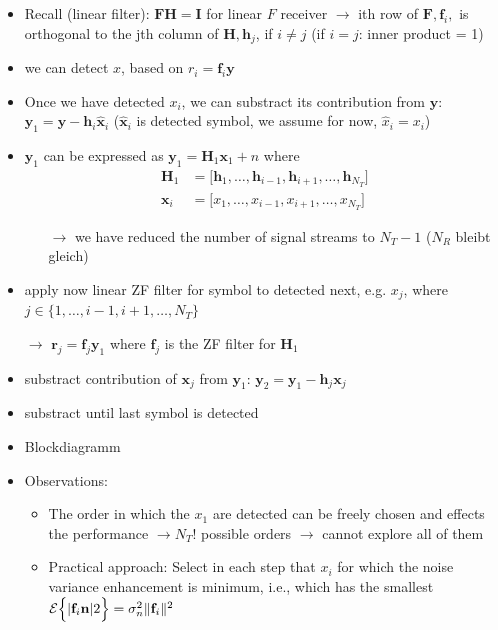 \documentclass[a4paper, 10pt]{article}
\begin{document}
\begin{itemize}
	\item Recall (linear filter): $\mathbf{FH} = \mathbf{I} $ for linear $F $ receiver $\rightarrow $ ith row of $\mathbf{F}, \mathbf{f}_i, $ is orthogonal to the jth column of $\mathbf{H}, \mathbf{h}_j$, if $ i \neq j$ (if $i = j$: inner product = 1)  
	\item we can detect $x$, based on $r_i = \mathbf{f}_i\mathbf{y} $
	\item Once we have detected $x_i$, we can substract its contribution from $\mathbf{y}$: $\mathbf{y}_1 = \mathbf{y} - \mathbf{h}_i\hat{\mathbf{x}}_i $ ($\hat{\mathbf{x}}_i $ is detected symbol, we assume for now, $\hat{x}_i = x_i $) 
	\item $\mathbf{y}_1 $ can be expressed as $ \mathbf{y}_1 = \mathbf{H}_1\mathbf{x}_1 + n$ where 
	\begin{align*}
		\mathbf{H}_1 &= \bigl[\mathbf{h}_1, \dots ,\mathbf{h}_{i-1},\mathbf{h}_{i+1},\dots ,\mathbf{h}_{N_T} \bigr] \\
		\mathbf{x}_i &= \bigl[x_1, \dots , x_{i-1}, x_{i+1}, \dots ,x_{N_T}\bigr]
	\end{align*}
	\begin{itemize}
		\item[$\rightarrow$] we have reduced the number of signal streams to $N_T - 1$ ($N_R $ bleibt gleich)
	\end{itemize}
	\item apply now linear ZF filter for symbol to detected next, e.g. $x_j $, where $ j\in \bigl\{1, \dots ,i - 1, i + 1, \dots , N_T\bigr\} $
	\item[$\rightarrow$] $ \mathbf{r}_j = \mathbf{f}_j\mathbf{y}_1 $ where $\mathbf{f}_j $ is the ZF filter for $\mathbf{H}_1$ 
	\item substract contribution of $\mathbf{x}_j $ from $\mathbf{y}_1 $: $\mathbf{y}_2 = \mathbf{y}_1 - \mathbf{h}_j\mathbf{x}_j $
	\item substract until last symbol is detected
	\item Blockdiagramm %
	\item Observations:
	\begin{itemize}
		\item The order in which the $x_1 $ are detected can be freely chosen and effects the performance $\rightarrow  N_T! $ possible orders $\rightarrow$ cannot explore all of them
		\item Practical approach: Select in each step that $x_i $ for which the noise variance enhancement is minimum, i.e., which has the smallest $\mathcal{E}\Bigl\{|\mathbf{f}_i\mathbf{n}|2\Bigr\} = \sigma _n^2\|\mathbf{f}_i\|^2 $ 

\end{itemize}
\end{itemize}
\end{document}
